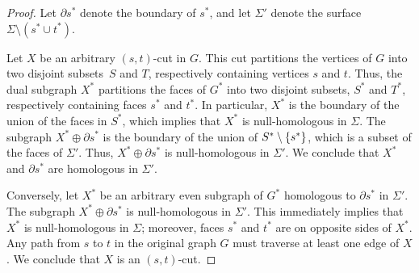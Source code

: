 \documentclass[11pt,twoside]{article}
\def\Cut{X}
\begin{document}
\begin{proof}
Let $\partial s^*$ denote the boundary of $s^*$, and let $\Sigma'$ denote the surface $\Sigma\setminus {(s^*\cup t^*)}$.

Let $\Cut$ be an arbitrary $(s,t)$-cut in $G$.  This cut partitions the vertices of $G$ into two disjoint subsets~$S$ and $T$, respectively containing vertices $s$ and $t$.  Thus, the dual subgraph $\Cut^*$ partitions the faces of $G^*$ into two disjoint subsets, $S^*$ and $T^*$, respectively containing faces $s^*$ and $t^*$.  In particular, $\Cut^*$ is the boundary of the union of the faces in $S^*$, which implies that $\Cut^*$ is null-homologous in $\Sigma$.  The subgraph $\Cut^* \oplus \partial s^*$ is the boundary of the union of $S^* \setminus\{ s^* \}$, which is a subset of the faces of $\Sigma'$.  Thus, $\Cut^*\oplus \partial s^*$ is null-homologous in $\Sigma'$.  We conclude that $\Cut^*$ and  $\partial s^*$ are homologous in $\Sigma'$.

Conversely, let $\Cut^*$ be an arbitrary even subgraph of $G^*$ homologous to $\partial s^*$ in $\Sigma'$.  The subgraph $\Cut^*\oplus \partial s^*$ is null-homologous in $\Sigma'$.  This immediately implies that $X^*$ is null-homologous in $\Sigma$; moreover, faces $s^*$ and $t^*$ are on opposite sides of $X^*$.  Any path from $s$ to $t$ in the original graph $G$ must traverse at least one edge of $\Cut$.  We conclude that $\Cut$ is an $(s,t)$-cut.
\end{proof}

%
%
%
%
\end{document}
